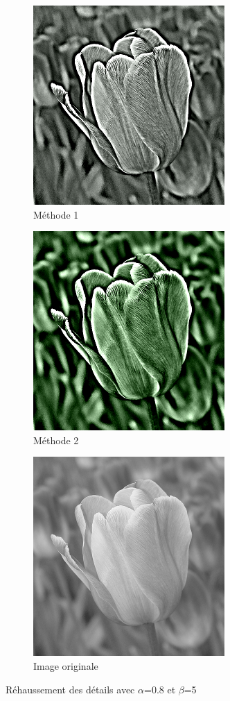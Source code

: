 \documentclass[twoside,UTF8]{EPURapport}
\begin{document}
\begin{figure}[H]
        \centering
        \begin{subfigure}[b]{0.3\textwidth}
                \includegraphics[scale=0.45]{images/flower1_08_5.png} 
                \caption{Méthode 1}
        \end{subfigure}
        \qquad \qquad
        \begin{subfigure}[b]{0.3\textwidth}
                \includegraphics[scale=0.45]{images/flower2_08_5.png}
                \caption{Méthode 2}
        \end{subfigure}
        
        \begin{subfigure}[b]{0.3\textwidth}
                \includegraphics[scale=0.45]{images/flower.png}
             	\caption{Image originale}
        \end{subfigure}
        \caption{Réhaussement des détails avec $\alpha$=0.8 et $\beta$=5}
\end{figure}
\end{document}
